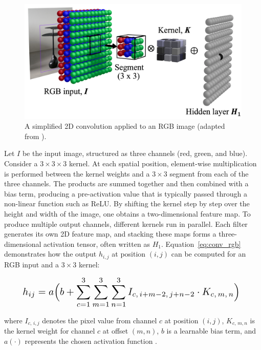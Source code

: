 \documentclass[a4paper,10pt,twocolumn]{article}
\numberwithin{figure}{section}
\numberwithin{table}{section}
\begin{document}
\begin{figure}[htbp]
    \centering
    \includegraphics[width=1\linewidth]{3D.png} 
    \caption{A simplified 2D convolution applied to an RGB image (adapted from \citep{prince2023understanding}).}
    \label{fig:3D}  
\end{figure}

Let \(I\) be the input image, structured as three channels (red, green, and blue). Consider a \(3 \times 3 \times 3\) kernel. 
At each spatial position, element-wise multiplication is performed between the kernel weights 
and a \(3 \times 3\) segment from each of the three channels. The products are summed together and then combined with a bias term, producing a pre-activation value that is typically passed through a non-linear function such as ReLU. By shifting the kernel step by step over the height and width of the image, one obtains a two-dimensional feature map. To produce multiple output channels, different kernels run in parallel. Each filter generates its own 2D feature map, and stacking these maps forms a three-dimensional activation tensor, often written as \(H_{1}\).
Equation~\eqref{eq:conv_rgb} demonstrates how the output \(h_{i,j}\) at position \((i,j)\) can be computed for an RGB input and a \(3 \times 3\) kernel:

\begin{equation}
    \label{eq:conv_rgb}
    \resizebox{0.9\columnwidth}{!}{%
    \(
    \displaystyle
    h_{ij} = a \Bigl(
    b + \sum\limits_{c=1}^{3}
             \sum\limits_{m=1}^{3}
             \sum\limits_{n=1}^{3}
    I_{c,\,i+m-2,\,j+n-2} \cdot K_{c,\,m,\,n}
    \Bigr)
    \)
    }
    \end{equation}
    
    
where \(I_{c,\,i,j}\) denotes the pixel value from channel \(c\) at position \((i,j)\), \(K_{c,\,m,n}\) is the kernel weight for channel \(c\) at offset \((m,n)\), \(b\) is a learnable bias term, and \(a(\cdot)\) represents the chosen activation function
\cite[p.~170]{prince2023understanding}.
\end{document}
